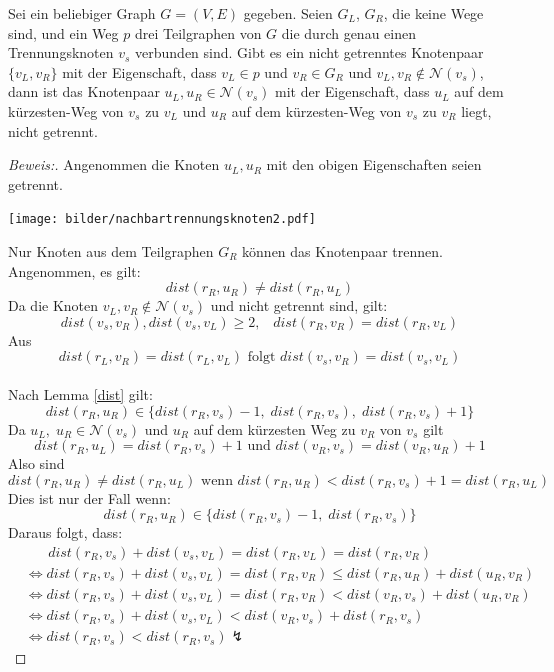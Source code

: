 \begin{lem}
\label{nachbartrennungsknoten2}
Sei ein beliebiger Graph $G=(V,E)$ gegeben. Seien $G_L$, $G_R$, die keine Wege sind, und ein Weg $p$ drei Teilgraphen von $G$ die durch genau einen Trennungsknoten $v_s$ verbunden sind. Gibt es ein nicht getrenntes Knotenpaar $\{v_L,v_R\}$ mit der Eigenschaft, dass $v_L\in p$ und $v_R \in G_R$ und $v_L, v_R \notin \mathcal{N}(v_s)$, dann ist das Knotenpaar $u_L,u_R \in \mathcal{N}(v_s)$ mit der Eigenschaft, dass $u_L$ auf dem kürzesten-Weg von $v_s$ zu $v_L$ und $u_R$ auf dem kürzesten-Weg von $v_s$ zu $v_R$ liegt, nicht getrennt.
\end{lem}
\par
\begin{proof}[Beweis:] Angenommen die Knoten $u_L,u_R$ mit den obigen Eigenschaften seien getrennt.
\begin{floatingfigure}[r]{200pt}
\centering
\texttt{[image: bilder/nachbartrennungsknoten2.pdf]}
\end{floatingfigure}
Nur Knoten aus dem Teilgraphen $G_R$ können das Knotenpaar trennen. Angenommen, es gilt: $$dist(r_R,u_R)\neq dist(r_R,u_L)$$
\newline
Da die Knoten $v_L, v_R \notin \mathcal{N}(v_s)$ und nicht getrennt sind, gilt: $$dist(v_s,v_R),dist(v_s,v_L)\geq 2,\;\;\; dist(r_R,v_R)=dist(r_R,v_L)$$ 
Aus $$dist(r_L,v_R)=dist(r_L,v_L) \text{ folgt }dist(v_s,v_R)=dist(v_s,v_L)$$\\
Nach Lemma \ref{dist} gilt: $$dist(r_R,u_R)\in \{dist(r_R,v_s)-1,\; dist(r_R,v_s),\;dist(r_R,v_s)+1\}$$
Da $u_L,\;u_R \in \mathcal{N}(v_s)$ und $u_R$ auf dem kürzesten Weg zu $v_R$ von $v_s$ gilt $$dist(r_R,u_L)=dist(r_R,v_s)+1\text{ und }dist(v_R,v_s)=dist(v_R,u_R)+1$$
Also sind $$dist(r_R,u_R)\neq dist(r_R,u_L)\text{ wenn }dist(r_R,u_R)<dist(r_R,v_s)+1=dist(r_R,u_L)$$
Dies ist nur der Fall wenn: $$dist(r_R,u_R)\in \{dist(r_R,v_s)-1,\; dist(r_R,v_s)\}$$
Daraus folgt, dass:
\begin{align*}
&\;\;\;\;\;\;dist(r_R,v_s)+dist(v_s,v_L)=dist(r_R,v_L)=dist(r_R,v_R)\\
&\Leftrightarrow  dist(r_R,v_s)+dist(v_s,v_L)=dist(r_R,v_R) \leq dist(r_R,u_R)+dist(u_R,v_R)\\
&\Leftrightarrow  dist(r_R,v_s)+dist(v_s,v_L)=dist(r_R,v_R)< dist(v_R,v_s)+dist(u_R,v_R)\\
&\Leftrightarrow  dist(r_R,v_s)+dist(v_s,v_L)< dist(v_R,v_s)+dist(r_R,v_s)\\
&\Leftrightarrow  dist(r_R,v_s)<dist(r_R,v_s)\lightning
\end{align*}
\end{proof}
\par
